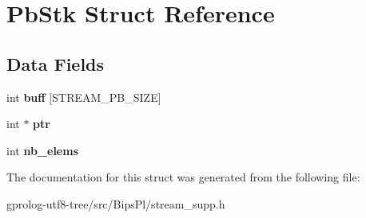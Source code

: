 \hypertarget{structPbStk}{}\section{Pb\+Stk Struct Reference}
\label{structPbStk}
\subsection*{Data Fields}
\begin{DoxyCompactItemize}
\item 
int {\bfseries buff} \mbox{[}S\+T\+R\+E\+A\+M\+\_\+\+P\+B\+\_\+\+S\+I\+ZE\mbox{]}\hypertarget{structPbStk_a753c451400807eac788034c15a4e9810}{}\label{structPbStk_a753c451400807eac788034c15a4e9810}

\item 
int $\ast$ {\bfseries ptr}\hypertarget{structPbStk_a739af7eef937b961dc73fec61672bee2}{}\label{structPbStk_a739af7eef937b961dc73fec61672bee2}

\item 
int {\bfseries nb\+\_\+elems}\hypertarget{structPbStk_a222a0c77b4b0feef1323dc7cf1f0e74b}{}\label{structPbStk_a222a0c77b4b0feef1323dc7cf1f0e74b}

\end{DoxyCompactItemize}


The documentation for this struct was generated from the following file\+:\begin{DoxyCompactItemize}
\item 
gprolog-\/utf8-\/tree/src/\+Bips\+Pl/stream\+\_\+supp.\+h\end{DoxyCompactItemize}
